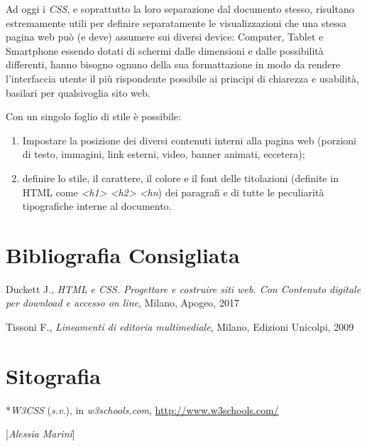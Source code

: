 Ad oggi i \emph{CSS}, e soprattutto la loro separazione dal documento
stesso, risultano estremamente utili per definire separatamente le
visualizzazioni che una stessa pagina web può (e deve) assumere sui
diversi device: Computer, Tablet e Smartphone essendo dotati di schermi
dalle dimensioni e dalle possibilità differenti, hanno bisogno ognuno
della sua formattazione in modo da rendere l'interfaccia utente il più
rispondente possibile ai principi di chiarezza e usabilità, basilari per
qualsivoglia sito web.

Con un singolo foglio di stile è possibile:

\begin{enumerate}
\def\labelenumi{\arabic{enumi}.}
\item
  Impostare la posizione dei diversi contenuti interni alla pagina web
  (porzioni di testo, immagini, link esterni, video, banner animati,
  eccetera);
\item
  definire lo stile, il carattere, il colore e il font delle titolazioni
  (definite in HTML come \emph{\textless{}h1\textgreater{}
  \textless{}h2\textgreater{} \textless{}hn}) dei
  paragrafi e di tutte le peculiarità tipografiche interne al documento.
\end{enumerate}

\section*{Bibliografia Consigliata}
{\parindent0pt 
Duckett J., \emph{HTML e CSS. Progettare e costruire siti web. Con
Contenuto digitale per download e accesso on line}, Milano, Apogeo, 2017

Tissoni F., \emph{Lineamenti di editoria multimediale}, Milano, Edizioni
Unicolpi, 2009
}

\section*{Sitografia}
{\parindent0pt 
*\emph{W3CSS} (\emph{s.v}.), in \emph{w3schools.com},
\url{http://www.w3schools.com/}
}

\hrulefill 

{[}\emph{Alessia Marini}{]}
